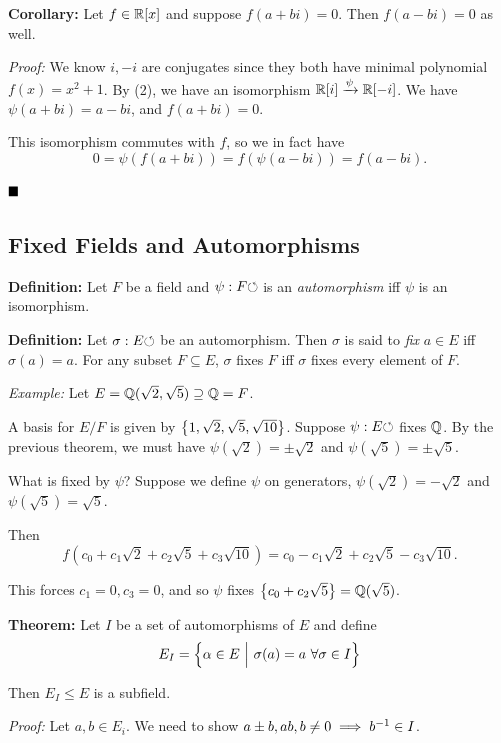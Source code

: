 \textbf{Corollary:} Let \(f \in {\mathbb{R}}[x]\) and suppose \(f(a+bi) = 0\).
Then \(f(a - bi) = 0\) as well.

\emph{Proof:} We know \(i, -i\) are conjugates since they both have
minimal polynomial \(f(x) = x^2 + 1\). By (2), we have an isomorphism
\({\mathbb{R}}[i] \xrightarrow{\psi} {\mathbb{R}}[-i]\). We have \(\psi(a+bi) = a-bi\), and
\(f(a+bi) = 0\).

This isomorphism commutes with \(f\), so we in fact have \[
0 = \psi(f(a+bi)) = f(\psi(a-bi)) = f(a-bi)
.\]

\(\qed\)

\hypertarget{fixed-fields-and-automorphisms}{%
\subsection{Fixed Fields and
Automorphisms}\label{fixed-fields-and-automorphisms}}

\textbf{Definition:} Let \(F\) be a field and \(\psi: F {\circlearrowleft}\) is an
\emph{automorphism} iff \(\psi\) is an isomorphism.

\textbf{Definition:} Let \(\sigma: E{\circlearrowleft}\) be an automorphism. Then
\(\sigma\) is said to \emph{fix} \(a\in E\) iff \(\sigma(a) = a\). For
any subset \(F \subseteq E\), \(\sigma\) fixes \(F\) iff \(\sigma\)
fixes every element of \(F\).

\emph{Example:} Let \(E = {\mathbb{Q}}(\sqrt 2, \sqrt 5) \supseteq {\mathbb{Q}} = F\).

A basis for \(E/F\) is given by
\(\left\{{1, \sqrt 2, \sqrt 5, \sqrt {10}}\right\}\). Suppose
\(\psi: E{\circlearrowleft}\) fixes \({\mathbb{Q}}\). By the previous theorem, we must have
\(\psi(\sqrt 2) = \pm \sqrt 2\) and \(\psi(\sqrt 5) = \pm \sqrt 5\).

What is fixed by \(\psi\)? Suppose we define \(\psi\) on generators,
\(\psi(\sqrt 2) = -\sqrt 2\) and \(\psi(\sqrt 5) = \sqrt 5\).

Then \[
f(c_0 + c_1 \sqrt 2 + c_2 \sqrt 5 + c_3 \sqrt{10}) = c_0 - c_1\sqrt 2 + c_2 \sqrt 5 - c_3\sqrt{10}
.\]

This forces \(c_1 = 0, c_3 = 0\), and so \(\psi\) fixes
\(\left\{{ c_0 + c_2 \sqrt 5 }\right\} = {\mathbb{Q}}(\sqrt 5)\).

\textbf{Theorem:} Let \(I\) be a set of automorphisms of \(E\) and
define \[
E_I = \left\{{\alpha \in E {~\mathrel{\Big|}~} \sigma(a) = a ~\forall \sigma \in I}\right\}
\]

Then \(E_I \leq E\) is a subfield.

\emph{Proof:} Let \(a,b \in E_i\). We need to show
\(a \pm b, ab, b\neq 0 \implies b^{-1} \in I\).

